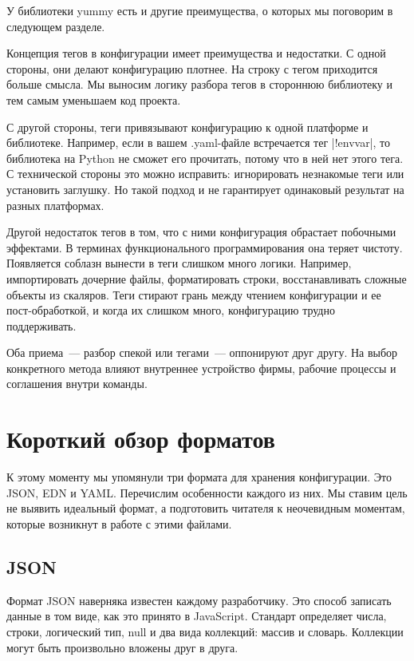 У библиотеки yummy есть и другие преимущества, о которых мы поговорим в
следующем разделе.

Концепция тегов в конфигурации имеет преимущества и недостатки. С одной стороны,
они делают конфигурацию плотнее. На строку с тегом приходится больше смысла. Мы
выносим логику разбора тегов в стороннюю библиотеку и тем самым уменьшаем код
проекта.

С другой стороны, теги привязывают конфигурацию к одной платформе и
библиотеке. Например, если в вашем .yaml-файле встречается тег \spverb|!envvar|, то
библиотека на Python не сможет его прочитать, потому что в ней нет этого тега. С
технической стороны это можно исправить: игнорировать незнакомые теги или
установить заглушку. Но такой подход и не гарантирует одинаковый результат на
разных платформах.

Другой недостаток тегов в том, что с ними конфигурация обрастает побочными
эффектами. В терминах функционального программирования она теряет
чистоту. Появляется соблазн вынести в теги слишком много логики. Например,
импортировать дочерние файлы, форматировать строки, восстанавливать сложные
объекты из скаляров. Теги стирают грань между чтением конфигурации и ее
пост-обработкой, и когда их слишком много, конфигурацию трудно поддерживать.

Оба приема~--- разбор спекой или тегами~--- оппонируют друг другу. На выбор
конкретного метода влияют внутреннее устройство фирмы, рабочие процессы и
соглашения внутри команды.

\section{Короткий обзор форматов}

К этому моменту мы упомянули три формата для хранения конфигурации. Это JSON,
EDN и YAML. Перечислим особенности каждого из них. Мы ставим цель не выявить
идеальный формат, а подготовить читателя к неочевидным моментам, которые
возникнут в работе с этими файлами.

\subsection{JSON}

Формат JSON наверняка известен каждому разработчику. Это способ записать данные
в том виде, как это принято в JavaScript. Стандарт определяет числа, строки,
логический тип, null и два вида коллекций: массив и словарь. Коллекции могут
быть произвольно вложены друг в друга.

